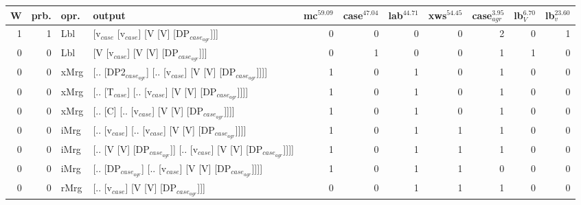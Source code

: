 \begin{tabularx}{\linewidth}{rrlXrrrrrrr}
\hline
   W &   prb. & opr.   & output                                                         &   mc$^{59.09}$ &   case$^{47.04}$ &   lab$^{44.71}$ &   xws$^{54.45}$ &   case$_{agr}^{3.95}$ &   lb$_{V}^{6.70}$ &   lb$_{v}^{23.60}$ \\
\hline
   1 &   1 & Lbl  & [v$_{case}$ [v$_{case}$] [V [V] [DP$_{case_{agr}}$]]]                        &            0 &              0 &             0 &             0 &                  2 &              0 &              1 \\
   0 &   0 & Lbl  & [V [v$_{case}$] [V [V] [DP$_{case_{agr}}$]]]                             &            0 &              1 &             0 &             0 &                  1 &              1 &              0 \\
   0 &   0 & xMrg & [.. [DP2$_{case_{agr}}$] [.. [v$_{case}$] [V [V] [DP$_{case_{agr}}$]]]]        &            1 &              0 &             1 &             0 &                  1 &              0 &              0 \\
   0 &   0 & xMrg & [.. [T$_{case}$] [.. [v$_{case}$] [V [V] [DP$_{case_{agr}}$]]]]              &            1 &              0 &             1 &             0 &                  1 &              0 &              0 \\
   0 &   0 & xMrg & [.. [C] [.. [v$_{case}$] [V [V] [DP$_{case_{agr}}$]]]]                   &            1 &              0 &             1 &             0 &                  1 &              0 &              0 \\
   0 &   0 & iMrg & [.. [v$_{case}$] [.. [v$_{case}$] [V [V] [DP$_{case_{agr}}$]]]]              &            1 &              0 &             1 &             1 &                  1 &              0 &              0 \\
   0 &   0 & iMrg & [.. [V [V] [DP$_{case_{agr}}$]] [.. [v$_{case}$] [V [V] [DP$_{case_{agr}}$]]]] &            1 &              0 &             1 &             1 &                  1 &              0 &              0 \\
   0 &   0 & iMrg & [.. [DP$_{case_{agr}}$] [.. [v$_{case}$] [V [V] [DP$_{case_{agr}}$]]]]         &            1 &              0 &             1 &             1 &                  0 &              0 &              0 \\
   0 &   0 & rMrg & [.. [v$_{case}$] [V [V] [DP$_{case_{agr}}$]]]                            &            0 &              0 &             1 &             1 &                  1 &              0 &              0 \\
\hline
\end{tabularx}\endgroup\\
